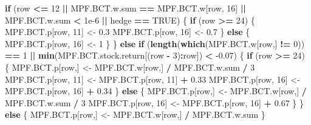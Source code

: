 \documentclass[]{article}
\newenvironment{Shaded}{\begin{snugshade}}{\end{snugshade}}
\newcommand{\ControlFlowTok}[1]{\textcolor[rgb]{0.13,0.29,0.53}{\textbf{#1}}}
\newcommand{\DecValTok}[1]{\textcolor[rgb]{0.00,0.00,0.81}{#1}}
\newcommand{\FloatTok}[1]{\textcolor[rgb]{0.00,0.00,0.81}{#1}}
\newcommand{\KeywordTok}[1]{\textcolor[rgb]{0.13,0.29,0.53}{\textbf{#1}}}
\newcommand{\NormalTok}[1]{#1}
\newcommand{\OperatorTok}[1]{\textcolor[rgb]{0.81,0.36,0.00}{\textbf{#1}}}
\newcommand{\OtherTok}[1]{\textcolor[rgb]{0.56,0.35,0.01}{#1}}
\newcommand{\StringTok}[1]{\textcolor[rgb]{0.31,0.60,0.02}{#1}}
\begin{document}
\begin{Shaded}
\begin{Highlighting}[]
  
  \ControlFlowTok{if}\NormalTok{ (row }\OperatorTok{<=}\StringTok{ }\DecValTok{12} \OperatorTok{||}\StringTok{ }\NormalTok{MPF.BCT.w.sum }\OperatorTok{==}\StringTok{ }\NormalTok{MPF.BCT.w[row, }\DecValTok{16}\NormalTok{] }\OperatorTok{||}
\StringTok{      }\NormalTok{MPF.BCT.w.sum }\OperatorTok{<}\StringTok{ }\FloatTok{1e-6} \OperatorTok{||}\StringTok{ }\NormalTok{hedge }\OperatorTok{==}\StringTok{ }\OtherTok{TRUE}\NormalTok{) \{}
    \ControlFlowTok{if}\NormalTok{ (row }\OperatorTok{>=}\StringTok{ }\DecValTok{24}\NormalTok{) \{}
\NormalTok{      MPF.BCT.p[row, }\DecValTok{11}\NormalTok{] <-}\StringTok{ }\FloatTok{0.3}
\NormalTok{      MPF.BCT.p[row, }\DecValTok{16}\NormalTok{] <-}\StringTok{ }\FloatTok{0.7}
\NormalTok{    \} }\ControlFlowTok{else}\NormalTok{ \{}
\NormalTok{      MPF.BCT.p[row, }\DecValTok{16}\NormalTok{] <-}\StringTok{ }\DecValTok{1}
\NormalTok{    \}}
\NormalTok{  \} }\ControlFlowTok{else} \ControlFlowTok{if}\NormalTok{ (}\KeywordTok{length}\NormalTok{(}\KeywordTok{which}\NormalTok{(MPF.BCT.w[row,] }\OperatorTok{!=}\StringTok{ }\DecValTok{0}\NormalTok{)) }\OperatorTok{==}\StringTok{ }\DecValTok{1} \OperatorTok{||}
\StringTok{             }\KeywordTok{min}\NormalTok{(MPF.BCT.stock.return[(row }\OperatorTok{-}\StringTok{ }\DecValTok{3}\NormalTok{)}\OperatorTok{:}\NormalTok{row]) }\OperatorTok{<}\StringTok{ }\FloatTok{-0.07}\NormalTok{) \{}
    \ControlFlowTok{if}\NormalTok{ (row }\OperatorTok{>=}\StringTok{ }\DecValTok{24}\NormalTok{) \{}
\NormalTok{      MPF.BCT.p[row,] <-}\StringTok{ }\NormalTok{MPF.BCT.w[row,] }\OperatorTok{/}\StringTok{ }\NormalTok{MPF.BCT.w.sum }\OperatorTok{/}\StringTok{ }\DecValTok{3}
\NormalTok{      MPF.BCT.p[row, }\DecValTok{11}\NormalTok{] <-}\StringTok{ }\NormalTok{MPF.BCT.p[row, }\DecValTok{11}\NormalTok{] }\OperatorTok{+}\StringTok{ }\FloatTok{0.33}
\NormalTok{      MPF.BCT.p[row, }\DecValTok{16}\NormalTok{] <-}\StringTok{ }\NormalTok{MPF.BCT.p[row, }\DecValTok{16}\NormalTok{] }\OperatorTok{+}\StringTok{ }\FloatTok{0.34}
\NormalTok{    \} }\ControlFlowTok{else}\NormalTok{ \{}
\NormalTok{      MPF.BCT.p[row,] <-}\StringTok{ }\NormalTok{MPF.BCT.w[row,] }\OperatorTok{/}\StringTok{ }\NormalTok{MPF.BCT.w.sum }\OperatorTok{/}\StringTok{ }\DecValTok{3}
\NormalTok{      MPF.BCT.p[row, }\DecValTok{16}\NormalTok{] <-}\StringTok{ }\NormalTok{MPF.BCT.p[row, }\DecValTok{16}\NormalTok{] }\OperatorTok{+}\StringTok{ }\FloatTok{0.67}
\NormalTok{    \}}
\NormalTok{  \} }\ControlFlowTok{else}\NormalTok{ \{}
\NormalTok{    MPF.BCT.p[row,] <-}\StringTok{ }\NormalTok{MPF.BCT.w[row,] }\OperatorTok{/}\StringTok{ }\NormalTok{MPF.BCT.w.sum}
\NormalTok{  \}}
  

\end{Highlighting}
\end{Shaded}
\end{document}
